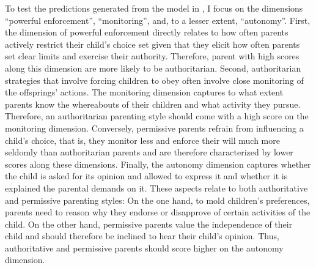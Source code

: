 To test the predictions generated from the model in \textcite{doepkeParentingStyleAltruism2017}, I focus on the dimensions ``powerful enforcement'', ``monitoring'', and, to a lesser extent, ``autonomy''. First, the dimension of powerful enforcement directly relates to how often parents actively restrict their child's choice set given that they elicit how often parents set clear limits and exercise their authority. Therefore, parent with high scores along this dimension are more likely to be authoritarian. Second, authoritarian strategies that involve forcing children to obey often involve close monitoring of the offsprings' actions. The monitoring dimension captures to what extent parents know the whereabouts of their children and what activity they pursue. Therefore, an authoritarian parenting style should come with a high score on the monitoring dimension. Conversely, permissive parents refrain from influencing a child's choice, that is, they monitor less and enforce their will much more seldomly than authoritarian parents and are therefore characterized by lower scores along these dimensions. Finally, the autonomy dimension captures whether the child is asked for its opinion and allowed to express it and whether it is explained the parental demands on it. These aspects relate to both authoritative and permissive parenting styles: On the one hand, to mold children's preferences, parents need to reason why they endorse or disapprove of certain activities of the child. On the other hand, permissive parents value the independence of their child and should therefore be inclined to hear their child's opinion. Thus, authoritative and permissive parents should score higher on the autonomy dimension.
%
